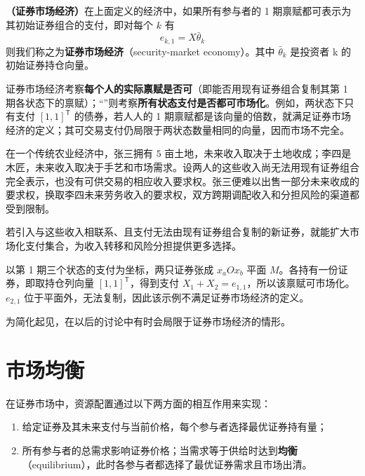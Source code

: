 \begin{tcolorbox}[knowledge]
\textbf{（证券市场经济）}\quad 在上面定义的经济中，如果所有参与者的 1 期禀赋都可表示为其初始证券组合的支付，即对每个 $k$ 有
\[
e_{k,1}=X\bar{\theta}_k
\]
则我们称之为\textbf{证券市场经济}（security-market economy）。其中 $\bar{\theta}_k$ 是投资者 k 的初始证券持仓向量。
\end{tcolorbox}

证券市场经济考察\textbf{每个人的实际禀赋是否可}（即能否用现有证券组合复制其第 1 期各状态下的禀赋）；“”则考察\textbf{所有状态支付是否都可市场化}。例如，两状态下只有支付 $[1,1]^{\mathsf T}$ 的债券，若人人的 1 期禀赋都是该向量的倍数，就满足证券市场经济的定义；其可交易支付仍局限于两状态数量相同的向量，因而市场不完全。

\begin{tcolorbox}[example,title=课堂例题：土地收成与劳动收入]
在一个传统农业经济中，张三拥有 $5$ 亩土地，未来收入取决于土地收成；李四是木匠，未来收入取决于手艺和市场需求。设两人的这些收入尚无法用现有证券组合完全表示，也没有可供交易的相应收入要求权。张三便难以出售一部分未来收成的要求权，换取李四未来劳务收入的要求权，双方跨期调配收入和分担风险的渠道都受到限制。

若引入与这些收入相联系、且支付无法由现有证券组合复制的新证券，就能扩大市场化支付集合，为收入转移和风险分担提供更多选择。
\end{tcolorbox}

 以第 1 期三个状态的支付为坐标，两只证券张成 $x_aOx_b$ 平面 $M$。各持有一份证券，即取持仓列向量 $[1,1]^{\mathsf T}$，得到支付 $X_1+X_2=e_{1,1}$，所以该禀赋可市场化。$e_{2,1}$ 位于平面外，无法复制，因此该示例不满足证券市场经济的定义。


为简化起见，在以后的讨论中有时会局限于证券市场经济的情形。

\section{市场均衡}

在证券市场中，资源配置通过以下两方面的相互作用来实现：
\begin{enumerate}
    \item 给定证券及其未来支付与当前价格，每个参与者选择最优证券持有量；
    \item 所有参与者的总需求影响证券价格；当需求等于供给时达到\textbf{均衡}（equilibrium），此时各参与者都选择了最优证券需求且市场出清。
\end{enumerate}

